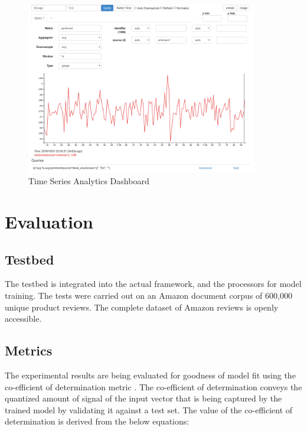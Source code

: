 \documentclass[conference]{IEEEtran}
\begin{document}
\begin{figure}[ht]
\centering
\includegraphics[width=0.9\textwidth]{images/bosun_dash_1.png}
\caption{Time Series Analytics Dashboard}
\label{fig:time-series-analytics-dashboard}
\end{figure}

\vspace{5mm}

\section{Evaluation}

    \subsection{Testbed}
    The testbed is integrated into the actual framework, and the processors for model training.
    The tests were carried out on an Amazon document corpus of 600,000 unique product reviews.
    The complete dataset of Amazon reviews is openly accessible\cite{amazon_datasets}.

    \subsection{Metrics}
    The experimental results are being evaluated for goodness of model fit using the co-efficient of determination metric \cite{jaeger1990statistics}.
    The co-efficient of determination conveys the quantized amount of signal of the input vector that is being captured by the trained model by validating it against a test set. 
    The value of the co-efficient of determination is derived from the below equations:
\end{document}
